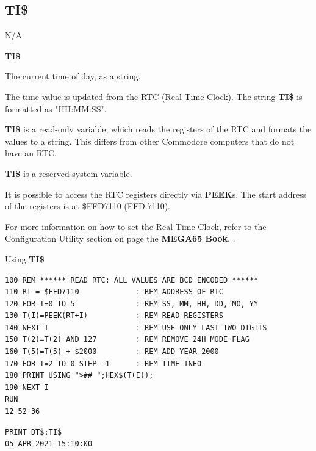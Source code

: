 \subsection{TI\$}
\begin{description}[leftmargin=2cm,style=nextline]
\item [Token:]    N/A

\item [Format:]   {\bf TI\$}

\item [Usage:]    The current time of day, as a string.

                  The time value is updated from the RTC (Real-Time Clock). The string {\bf TI\$} is formatted as "HH:MM:SS".

                  {\bf TI\$} is a read-only variable, which reads the registers of the RTC and formats the values to a string. This differs from other Commodore computers that do not have an RTC.

\item [Remarks:]  {\bf TI\$} is a reserved system variable.

                  It is possible to access the RTC registers directly via {\bf PEEK}s. The start address of the registers is at \$FFD7110 (FFD.7110).

                  For more information on how to set the Real-Time Clock, refer to the Configuration Utility section on page \ifdefined\printmanual
                     the {\bf MEGA65 Book}.
                  \else
                     .
                  \fi

\item [Examples:] Using {\bf TI\$}

\begin{tcolorbox}[colback=black,coltext=white]
\verbatimfont{\codefont}
\begin{verbatim}
100 REM ****** READ RTC: ALL VALUES ARE BCD ENCODED ******
110 RT = $FFD7110             : REM ADDRESS OF RTC
120 FOR I=0 TO 5              : REM SS, MM, HH, DD, MO, YY
130 T(I)=PEEK(RT+I)           : REM READ REGISTERS
140 NEXT I                    : REM USE ONLY LAST TWO DIGITS
150 T(2)=T(2) AND 127         : REM REMOVE 24H MODE FLAG
160 T(5)=T(5) + $2000         : REM ADD YEAR 2000
170 FOR I=2 TO 0 STEP -1      : REM TIME INFO
180 PRINT USING ">## ";HEX$(T(I));
190 NEXT I
RUN
12 52 36
\end{verbatim}
\end{tcolorbox}

\begin{tcolorbox}[colback=black,coltext=white]
\verbatimfont{\codefont}
\begin{verbatim}
PRINT DT$;TI$
05-APR-2021 15:10:00
\end{verbatim}
\end{tcolorbox}
\end{description}

